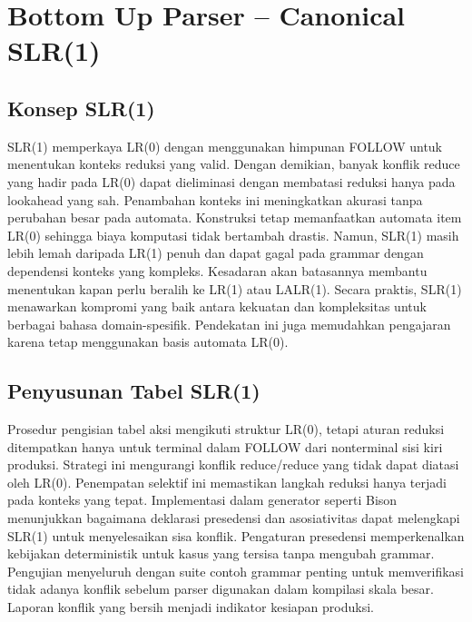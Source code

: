 \documentclass[../main.tex]{subfiles}
\begin{document}
\chapter{Bottom Up Parser – Canonical SLR(1)}
\label{ch:slr1}

\section{Konsep SLR(1)}
SLR(1) memperkaya LR(0) dengan menggunakan himpunan FOLLOW untuk menentukan konteks reduksi yang valid. Dengan demikian, banyak konflik reduce yang hadir pada LR(0) dapat dieliminasi dengan membatasi reduksi hanya pada lookahead yang sah.\cite{aho-dragon-book-2006} Penambahan konteks ini meningkatkan akurasi tanpa perubahan besar pada automata.
Konstruksi tetap memanfaatkan automata item LR(0) sehingga biaya komputasi tidak bertambah drastis. Namun, SLR(1) masih lebih lemah daripada LR(1) penuh dan dapat gagal pada grammar dengan dependensi konteks yang kompleks.\cite{grune-parsing} Kesadaran akan batasannya membantu menentukan kapan perlu beralih ke LR(1) atau LALR(1).
Secara praktis, SLR(1) menawarkan kompromi yang baik antara kekuatan dan kompleksitas untuk berbagai bahasa domain-spesifik. Pendekatan ini juga memudahkan pengajaran karena tetap menggunakan basis automata LR(0).

\section{Penyusunan Tabel SLR(1)}
Prosedur pengisian tabel aksi mengikuti struktur LR(0), tetapi aturan reduksi ditempatkan hanya untuk terminal dalam FOLLOW dari nonterminal sisi kiri produksi. Strategi ini mengurangi konflik reduce/reduce yang tidak dapat diatasi oleh LR(0).\cite{aho-dragon-book-2006} Penempatan selektif ini memastikan langkah reduksi hanya terjadi pada konteks yang tepat.
Implementasi dalam generator seperti Bison menunjukkan bagaimana deklarasi presedensi dan asosiativitas dapat melengkapi SLR(1) untuk menyelesaikan sisa konflik.\cite{bison-manual} Pengaturan presedensi memperkenalkan kebijakan deterministik untuk kasus yang tersisa tanpa mengubah grammar.
Pengujian menyeluruh dengan suite contoh grammar penting untuk memverifikasi tidak adanya konflik sebelum parser digunakan dalam kompilasi skala besar. Laporan konflik yang bersih menjadi indikator kesiapan produksi.

\IfSubfilesClassLoaded{%
\printbibliography
}{}
\end{document}

